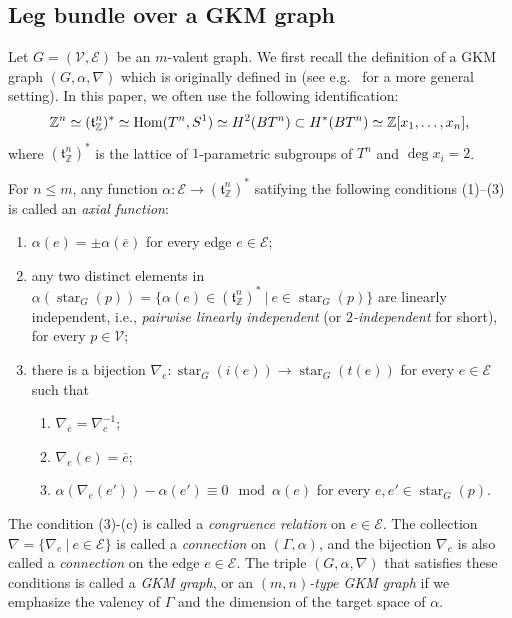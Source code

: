 \documentclass[12pt]{amsart}
\theoremstyle{definition}
\theoremstyle{remark}
\numberwithin{equation}{section}
\DeclareMathOperator{\str}{star}
\begin{document}
\subsection{Leg bundle over a GKM graph}
\label{sect:2.2}

Let $G=(\mathcal{V}, \mathcal{E})$ be an $m$-valent graph.
We first recall the definition of a GKM graph $(G,\alpha,\nabla)$ which is originally defined in  \cite{GZ} (see e.g.~\cite{MMP, DKS} for a more general setting).
In this paper, we often use the following identification:
\begin{align*}
\mathbb{Z}^{n}\simeq (\mathfrak{t}^{n}_{\mathbb{Z}})^{*}\simeq {\rm Hom}(T^{n},S^{1})\simeq H^{2}(BT^{n})\subset H^{*}(BT^{n})\simeq \mathbb{Z}[x_{1},\ldots, x_{n}],
\end{align*}
where $(\mathfrak{t}^{n}_{\mathbb{Z}})^{*}$ is the lattice of $1$-parametric subgroups of $T^{n}$ and $\deg x_{i}=2$.

For $n\le m$,
any function $\alpha:\mathcal{E}\to (\mathfrak{t}^{n}_{\mathbb{Z}})^{*}$ satifying the following conditions (1)--(3) is called an {\it axial function}:
\begin{enumerate}
\item $\alpha(e)=\pm \alpha(\overline{e})$ for every edge $e\in\mathcal{E}$;
\item any two distinct elements in $\alpha(\str_{G}(p))=\{\alpha(e)\in (\mathfrak{t}^{n}_{\mathbb{Z}})^{*}\ |\ e\in \str_{G}(p)\}$ are linearly independent, i.e., \textit{pairwise linearly independent} (or {\it $2$-independent} for short), for every $p\in \mathcal{V}$; \item there is a bijection $\nabla_{e}:\str_{G}(i(e))\to \str_{G}(t(e))$ for every $e\in \mathcal{E}$ such that
\begin{enumerate}
\item $\nabla_{\overline{e}}=\nabla_{e}^{-1}$;
\item $\nabla_{e}(e)=\overline{e}$;
\item $\alpha(\nabla_{e}(e'))-\alpha(e')\equiv 0\mod \alpha(e)$ for every $e, e'\in \str_{G}(p)$.
\end{enumerate}
\end{enumerate}
The condition (3)-(c) is called a {\it congruence relation} on $e\in \mathcal{E}$.
The collection $\nabla=\{\nabla_{e}\ |\ e\in \mathcal{E}\}$ is called a {\it connection} on $(\Gamma,\alpha)$, and the bijection
$\nabla_{e}$ is also called a {\it connection} on the edge $e\in \mathcal{E}$.
The triple $(G,\alpha,\nabla)$ that satisfies these conditions is called a {\it GKM graph}, or an {\it $(m,n)$-type GKM graph} if we emphasize the valency of $\Gamma$ and the dimension of the target space of $\alpha$.
\end{document}
